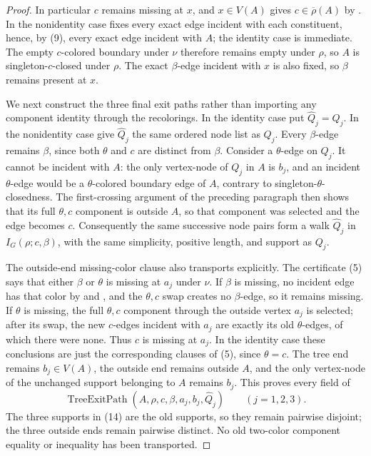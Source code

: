 \begin{proof}
In particular $c$ remains missing at $x$, and $x\in V(A)$ gives
$c\in\overline\rho(A)$ by .  In the
nonidentity case  fixes every exact
edge incident with each constituent, hence, by (9), every exact edge
incident with $A$; the identity case is immediate.  The empty $c$-colored
boundary under $\nu$ therefore remains empty under $\rho$, so $A$ is
singleton-$c$-closed under $\rho$.  The exact $\beta$-edge incident with
$x$ is also fixed, so $\beta$ remains present at $x$.

We next construct the three final exit paths rather than importing any
component identity through the recolorings.  In the identity case put
$\widehat Q_j=Q_j$.  In the nonidentity case give $\widehat Q_j$ the same ordered node list
as $Q_j$.  Every $\beta$-edge remains $\beta$, since both $\theta$ and $c$
are distinct from $\beta$.  Consider a $\theta$-edge on $Q_j$.  It cannot
be incident with $A$: the only vertex-node of $Q_j$ in $A$ is $b_j$, and
an incident $\theta$-edge would be a $\theta$-colored boundary edge of
$A$, contrary to singleton-$\theta$-closedness.  The first-crossing
argument of the preceding paragraph then shows that its full $\theta,c$
component is outside $A$, so that component was selected and the edge
becomes $c$.  Consequently the same successive node pairs form a walk
$\widehat Q_j$ in $I_G(\rho;c,\beta)$, with the same simplicity, positive length,
and support as $Q_j$.

The outside-end missing-color clause also transports explicitly.  The
certificate (5) says that either $\beta$ or $\theta$ is missing at $a_j$
under $\nu$.  If $\beta$ is missing, no incident edge has that color by
 and , and the
$\theta,c$ swap creates no $\beta$-edge, so it remains missing.  If
$\theta$ is missing, the full $\theta,c$ component through the outside
vertex $a_j$ is selected; after its swap, the new $c$-edges incident with
$a_j$ are exactly its old $\theta$-edges, of which there were none.  Thus
$c$ is missing at $a_j$.  In the identity case these conclusions are just
the corresponding clauses of (5), since $\theta=c$.  The tree end remains
$b_j\in V(A)$, the outside end remains outside $A$, and the only
vertex-node of the unchanged support belonging to $A$ remains $b_j$.
This proves every field of
\[
          \operatorname{TreeExitPath}(A,\rho,c,\beta,a_j,b_j,\widehat Q_j)
          \qquad(j=1,2,3).                                    \tag{14}
\]
The three supports in (14) are the old supports, so they remain pairwise
disjoint; the three outside ends remain pairwise distinct.  No old
two-color component equality or inequality has been transported.


\end{proof}
